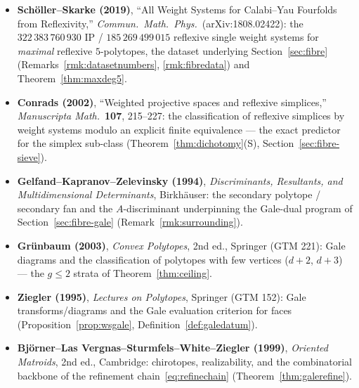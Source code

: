 \documentclass{amsart}
\begin{document}
\begin{itemize}
  \item \textbf{Sch\"oller--Skarke (2019)}, ``All Weight Systems for
        Calabi--Yau Fourfolds from Reflexivity,'' \emph{Commun.\ Math.\ Phys.}\
        (arXiv:1808.02422): the $322\,383\,760\,930$ IP /
        $185\,269\,499\,015$ reflexive single weight systems for \emph{maximal}
        reflexive $5$-polytopes, the dataset underlying
        Section~\ref{sec:fibre} (Remarks~\ref{rmk:datasetnumbers},
        \ref{rmk:fibredata}) and Theorem~\ref{thm:maxdeg5}.
  \item \textbf{Conrads (2002)}, ``Weighted projective spaces and reflexive
        simplices,'' \emph{Manuscripta Math.}\ \textbf{107}, 215--227: the
        classification of reflexive simplices by weight systems modulo an
        explicit finite equivalence --- the exact predictor for the simplex
        sub-class (Theorem~\ref{thm:dichotomy}(S),
        Section~\ref{sec:fibre-sieve}).
  \item \textbf{Gelfand--Kapranov--Zelevinsky (1994)}, \emph{Discriminants,
        Resultants, and Multidimensional Determinants}, Birkh\"auser: the
        secondary polytope / secondary fan and the $A$-discriminant
        underpinning the Gale-dual program of Section~\ref{sec:fibre-gale}
        (Remark~\ref{rmk:surrounding}).
  \item \textbf{Gr\"unbaum (2003)}, \emph{Convex Polytopes}, 2nd ed., Springer
        (GTM 221): Gale diagrams and the classification of polytopes with few
        vertices ($d{+}2$, $d{+}3$) --- the $g\le2$ strata of
        Theorem~\ref{thm:ceiling}.
  \item \textbf{Ziegler (1995)}, \emph{Lectures on Polytopes}, Springer
        (GTM 152): Gale transforms/diagrams and the Gale evaluation criterion
        for faces (Proposition~\ref{prop:wsgale},
        Definition~\ref{def:galedatum}).
  \item \textbf{Bj\"orner--Las Vergnas--Sturmfels--White--Ziegler (1999)},
        \emph{Oriented Matroids}, 2nd ed., Cambridge: chirotopes, realizability,
        and the combinatorial backbone of the refinement
        chain~\eqref{eq:refinechain} (Theorem~\ref{thm:galerefine}).
\end{itemize}
\end{document}

